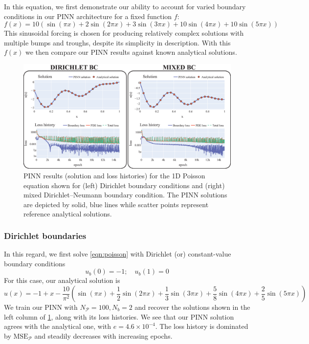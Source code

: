 \documentclass[11pt]{article}
\newcommand{\mse}{\textrm{MSE}}
\newcommand{\pde}{\ensuremath{\mathcal{P}}}
\begin{document}
In this equation, we first demonstrate our ability to account for varied boundary
conditions in our PINN architecture for a fixed function \(f\):
\[ f(x) = 10 \left(\sin(\pi x) + 2\sin(2\pi x) + 3\sin(3\pi x) + 10\sin(4\pi
   x) + 10\sin(5\pi x)\right) \]
This sinusoidal forcing is chosen for producing relatively complex
solutions with multiple bumps and troughs, despite its simplicity in description.
With this \(f(x)\) we then compare our PINN results against known
analytical solutions.
\begin{figure}[htbp]
\centering
\includegraphics[width=1.0\textwidth]{images/poisson.eps}
\caption{\label{fig:poisson_results}PINN results (solution and loss histories) for the 1D Poisson equation shown for (left) Dirichlet boundary conditions and (right) mixed Dirichlet--Neumann boundary condition. The PINN solutions are depicted by solid, blue lines while scatter points represent reference analytical solutions.}
\end{figure}

\subsubsection{Dirichlet boundaries}
\label{sec:orge32ce6b}
In this regard, we first solve \cref{eqn:poisson} with Dirichlet (or) constant-value
boundary conditions
\[ u_b(0) = -1 ;\quad  u_b(1) = 0\]
For this case, our analytical solution is
\[ \hat{u}(x) = -1 + x - \frac{10}{\pi^2} \left(\sin(\pi x) + \frac{1}{2}\sin(2\pi x) + \frac{1}{3}\sin(3\pi x) + \frac{5}{8}\sin(4\pi
	x) + \frac{2}{5}\sin(5\pi x)\right) \]
We train our PINN with \(N_\pde = 100 , N_b = 2\) and recover the solutions
shown in the left column of \cref{fig:poisson_results}, along with its loss
histories. We see that our PINN
solution agrees with the analytical one,
with \(e = 4.6 \times 10^{-4}\). The loss history is dominated by \(\mse_\pde\) and steadily decreases with increasing epochs.
\end{document}
